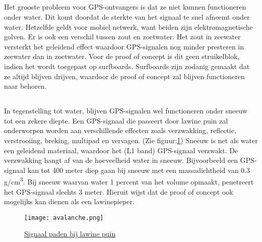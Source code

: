 \subsection{}
Het grooste probleem voor GPS-ontvangers is dat ze niet kunnen functioneren onder water. Dit komt doordat de sterkte van het signaal te snel afneemt onder water. Hetzelfde geldt voor mobiel netwerk, want beiden zijn elektromagnetische golven. \autocite{underwater} Er is ook een verschil tussen zout en zoetwater. Het zout in zeewater versterkt het geleidend effect waardoor GPS-signalen nog minder presteren in zeewater dan in zoetwater. Voor de proof of concept is dit geen struikelblok, indien het wordt toegepast op surfboards. Surfboards zijn zodanig gemaakt dat ze altijd blijven drijven, waardoor de proof of concept zal blijven functioneren naar behoren.
\subsection{}
In tegenstelling tot water, blijven GPS-signalen wel functioneren onder sneeuw tot een zekere diepte. Een GPS-signaal die passeert door lawine puin zal onderworpen worden aan verschillende effecten zoals verzwakking, reflectie, verstrooiing, breking, multipad en vervagen. (Zie figuur:\ref{fig:avalanche}) Sneeuw is net als water een geleidend materiaal, waardoor het (L1 band) GPS-signaal verzwakt. De verzwakking hangt af van de hoeveelheid water in sneeuw. Bijvoorbeeld een GPS-signaal kan tot 400 meter diep gaan bij sneeuw met een massadichtheid van 0.3 g/cm\textsuperscript{3}. Bij sneeuw waarvan water 1 percent van het volume opmaakt, penetreert het GPS-signaal slechts 3 meter.
\autocite{avalanche_gps} Hieruit wijst dat de proof of concept ook mogelijks kan dienen als een lawinepieper. 
\begin{figure}
    \texttt{[image: avalanche.png]}
    \caption{\href{https://www.researchgate.net/figure/Signal-Paths-in-Avalanche-Debris_fig1_253280455}{Signaal paden bij lawine puin}}
    \label{fig:avalanche}
\end{figure}
\pagebreak
